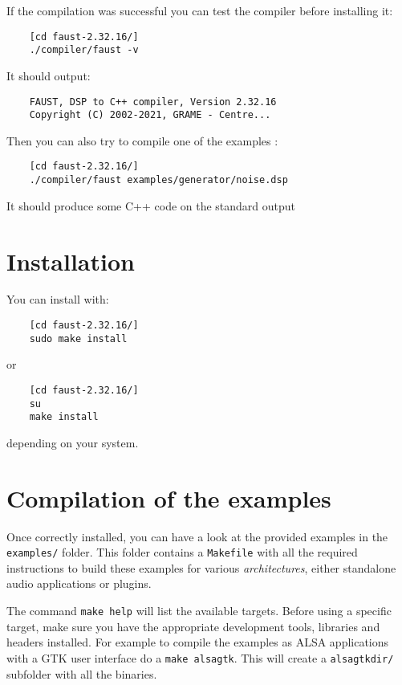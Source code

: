 If the compilation was successful you can test the compiler before installing it:
\begin{lstlisting}
	[cd faust-2.32.16/]
	./compiler/faust -v
\end{lstlisting}
It should output:
\begin{lstlisting}
	FAUST, DSP to C++ compiler, Version 2.32.16
	Copyright (C) 2002-2021, GRAME - Centre... 
\end{lstlisting}

Then you can also try to compile one of the examples :
\begin{lstlisting}
	[cd faust-2.32.16/]
	./compiler/faust examples/generator/noise.dsp
\end{lstlisting}
It should produce some C++ code on the standard output

\section{Installation}
You can install \faust with:
\begin{lstlisting}
	[cd faust-2.32.16/]
	sudo make install
\end{lstlisting}
or
\begin{lstlisting}
	[cd faust-2.32.16/]
	su
	make install
\end{lstlisting}
depending on your system.

\section{Compilation of the examples}
Once \faust correctly installed, you can have a look at the provided examples in the \lstinline'examples/' folder. This folder contains a  \lstinline'Makefile' with all the required instructions to build these examples for various \textit{architectures}, either standalone audio applications or plugins.

The command \lstinline'make help' will list the available targets. Before using a specific target, make sure you have the appropriate development tools, libraries and headers installed. For example to compile the examples as ALSA applications with a GTK user interface do a \lstinline'make alsagtk'. This will create a \lstinline'alsagtkdir/' subfolder with all the binaries. 

